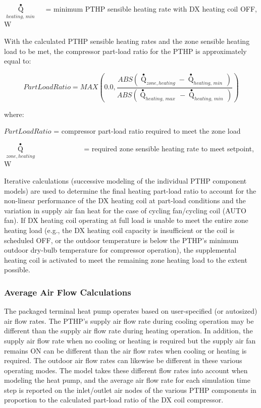 \({\mathop Q\limits^ \bullet_{heating,\,min\,}}\) ~ = minimum PTHP sensible heating rate with DX heating coil OFF, W

With the calculated PTHP sensible heating rates and the zone sensible heating load to be met, the compressor part-load ratio for the PTHP is approximately equal to:

\begin{equation}
PartLoadRatio = MAX\left( {0.0,\frac{{ABS\left( {{{\mathop Q\limits^ \bullet  }_{zone,heating}} - {{\mathop Q\limits^ \bullet  }_{heating,\,min\,}}} \right)}}{{ABS\left( {{{\mathop Q\limits^ \bullet  }_{heating,\,max\,}} - {{\mathop Q\limits^ \bullet  }_{heating,\,min\,}}} \right)}}} \right)
\end{equation}

where:

\(PartLoadRatio\) = compressor part-load ratio required to meet the zone load

\({\mathop Q\limits^ \bullet_{zone,heating}}\) ~~~~~~~~~~~~ = required zone sensible heating rate to meet setpoint, W

Iterative calculations (successive modeling of the individual PTHP component models) are used to determine the final heating part-load ratio to account for the non-linear performance of the DX heating coil at part-load conditions and the variation in supply air fan heat for the case of cycling fan/cycling coil (AUTO fan). If DX heating coil operating at full load is unable to meet the entire zone heating load (e.g., the DX heating coil capacity is insufficient or the coil is scheduled OFF, or the outdoor temperature is below the PTHP's minimum outdoor dry-bulb temperature for compressor operation), the supplemental heating coil is activated to meet the remaining zone heating load to the extent possible.

\subsubsection{Average Air Flow Calculations}\label{average-air-flow-calculations-1}

The packaged terminal heat pump operates based on user-specified (or autosized) air flow rates. The PTHP's supply air flow rate during cooling operation may be different than the supply air flow rate during heating operation. In addition, the supply air flow rate when no cooling or heating is required but the supply air fan remains ON can be different than the air flow rates when cooling or heating is required. The outdoor air flow rates can likewise be different in these various operating modes. The model takes these different flow rates into account when modeling the heat pump, and the average air flow rate for each simulation time step is reported on the inlet/outlet air nodes of the various PTHP components in proportion to the calculated part-load ratio of the DX coil compressor.

